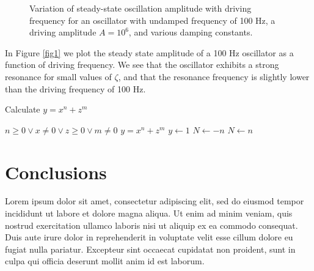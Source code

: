 \documentclass[journal,twocolumn]{IEEEtran}
\begin{document}
    
    




    \begin{figure}
        \begin{center}\end{center}
        \caption{Variation of steady-state oscillation amplitude with driving frequency for an oscillator with undamped frequency of 100 Hz, a driving amplitude $A = 10^6$, and various damping constants.}
        \label{figtest}
    \end{figure}
    
    In Figure \ref{fig1} we plot the steady state amplitude of a 100 Hz
oscillator as a function of driving frequency. We see that the
oscillator exhibits a strong resonance for small values of \(\zeta\),
and that the resonance frequency is slightly lower than the driving
frequency of 100 Hz.

\begin{algorithm}
\caption{Calculate $y = x^n + z^m$}
\begin{algorithmic} 
\REQUIRE $n \geq 0 \vee x \neq 0 \vee z \geq 0 \vee m \neq 0$
\ENSURE $y = x^n + z^m$
\STATE $y \leftarrow 1$
  \STATE $N \leftarrow -n$
\ELSE
  \STATE $N \leftarrow n$
\ENDIF
\end{algorithmic}
\end{algorithm}
    \hypertarget{conclusions}{%
\section{Conclusions}\label{conclusions}}

Lorem ipsum dolor sit amet, consectetur adipiscing elit, sed do eiusmod
tempor incididunt ut labore et dolore magna aliqua. Ut enim ad minim
veniam, quis nostrud exercitation ullamco laboris nisi ut aliquip ex ea
commodo consequat. Duis aute irure dolor in reprehenderit in voluptate
velit esse cillum dolore eu fugiat nulla pariatur. Excepteur sint
occaecat cupidatat non proident, sunt in culpa qui officia deserunt
mollit anim id est laborum.


    
    



    
    
\end{document}
